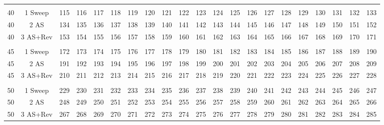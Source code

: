 \begin{table}[H]
{\begin{tabular}{ccccccccccccccccccccc}
 &  &  &  &  &  &  &  &  &  &  &  &  &  &  &  &  &  &  &  &  \\
\rowcolor[HTML]{ECF4FF} 
40 & 1 Sweep & 115 & 116 & 117 & 118 & 119 & 120 & 121 & 122 & 123 & 124 & 125 & 126 & 127 & 128 & 129 & 130 & 131 & 132 & 133 \\
\rowcolor[HTML]{FFFFC7} 
40 & 2 AS & 134 & 135 & 136 & 137 & 138 & 139 & 140 & 141 & 142 & 143 & 144 & 145 & 146 & 147 & 148 & 149 & 150 & 151 & 152 \\
\rowcolor[HTML]{FFCCC9} 
40 & 3 AS+Rev & 153 & 154 & 155 & 156 & 157 & 158 & 159 & 160 & 161 & 162 & 163 & 164 & 165 & 166 & 167 & 168 & 169 & 170 & 171 \\
 &  &  &  &  &  &  &  &  &  &  &  &  &  &  &  &  &  &  &  &  \\
\rowcolor[HTML]{ECF4FF} 
45 & 1 Sweep & 172 & 173 & 174 & 175 & 176 & 177 & 178 & 179 & 180 & 181 & 182 & 183 & 184 & 185 & 186 & 187 & 188 & 189 & 190 \\
\rowcolor[HTML]{FFFFC7} 
45 & 2 AS & 191 & 192 & 193 & 194 & 195 & 196 & 197 & 198 & 199 & 200 & 201 & 202 & 203 & 204 & 205 & 206 & 207 & 208 & 209 \\
\rowcolor[HTML]{FFCCC9} 
45 & 3 AS+Rev & 210 & 211 & 212 & 213 & 214 & 215 & 216 & 217 & 218 & 219 & 220 & 221 & 222 & 223 & 224 & 225 & 226 & 227 & 228 \\
 &  &  &  &  &  &  &  &  &  &  &  &  &  &  &  &  &  &  &  &  \\
\rowcolor[HTML]{ECF4FF} 
50 & 1 Sweep & 229 & 230 & 231 & 232 & 233 & 234 & 235 & 236 & 237 & 238 & 239 & 240 & 241 & 242 & 243 & 244 & 245 & 246 & 247 \\
\rowcolor[HTML]{FFFFC7} 
50 & 2 AS & 248 & 249 & 250 & 251 & 252 & 253 & 254 & 255 & 256 & 257 & 258 & 259 & 260 & 261 & 262 & 263 & 264 & 265 & 266 \\
\rowcolor[HTML]{FFCCC9} 
50 & 3 AS+Rev & 267 & 268 & 269 & 270 & 271 & 272 & 273 & 274 & 275 & 276 & 277 & 278 & 279 & 280 & 281 & 282 & 283 & 284 & 285
\end{tabular}%
}
\end{table}
